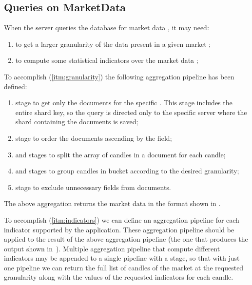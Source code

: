 \subsection{Queries on MarketData}\label{subsec:marketdata-aggregations}

When the server queries the database for market data , it may need:
\begin{enumerate}
	\item\label{itm:granularity} to get a larger granularity of the data
		present in a given market ;
	\item\label{itm:indicators} to compute some statistical indicators over
		the market data ;
\end{enumerate}

To accomplish (\ref{itm:granularity}) the following aggregation pipeline has
been defined:
\begin{enumerate}
	\item {} stage to get only the documents for the specific
		. This stage includes the entire shard key, so the
		query is directed only to the specific server where the shard
		containing the documents is saved;
	\item {} stage to order the documents ascending by the
		 field;
	\item {} and  stages to split the array
		of candles in a document for each candle;
	\item {} and  stages to group candles in
		bucket according to the desired granularity;
	\item {} stage to exclude unnecessary fields from
		documents.
\end{enumerate}

The above aggregation returns the market data in the format shown in
.



To accomplish (\ref{itm:indicators}) we can define an aggregation pipeline for
each indicator supported by the application. These aggregation pipeline should
be applied to the result of the above aggregation pipeline (the one that
produces the output shown in~). Multiple
aggregation pipeline that compute different indicators may be appended to a
single pipeline with a  stage, so that with just one pipeline we
can return the full list of candles of the market at the requested granularity
along with the values of the requested indicators for each candle.

